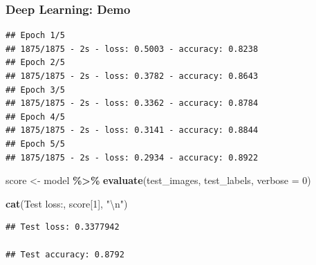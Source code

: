 \documentclass[
  shownotes,
  xcolor={svgnames},
  hyperref={colorlinks,citecolor=DarkBlue,linkcolor=DarkRed,urlcolor=DarkBlue}
  , aspectratio=169]{beamer}
\newenvironment{Shaded}{\begin{snugshade}}{\end{snugshade}}
\newcommand{\CharTok}[1]{\textcolor[rgb]{0.31,0.60,0.02}{#1}}
\newcommand{\DataTypeTok}[1]{\textcolor[rgb]{0.13,0.29,0.53}{#1}}
\newcommand{\DecValTok}[1]{\textcolor[rgb]{0.00,0.00,0.81}{#1}}
\newcommand{\KeywordTok}[1]{\textcolor[rgb]{0.13,0.29,0.53}{\textbf{#1}}}
\newcommand{\NormalTok}[1]{#1}
\newcommand{\OperatorTok}[1]{\textcolor[rgb]{0.81,0.36,0.00}{\textbf{#1}}}
\newcommand{\StringTok}[1]{\textcolor[rgb]{0.31,0.60,0.02}{#1}}
\begin{document}
\begin{frame}[fragile]
\frametitle{Deep Learning: Demo}
\begin{scriptsize}
\begin{verbatim}
## Epoch 1/5
## 1875/1875 - 2s - loss: 0.5003 - accuracy: 0.8238
## Epoch 2/5
## 1875/1875 - 2s - loss: 0.3782 - accuracy: 0.8643
## Epoch 3/5
## 1875/1875 - 2s - loss: 0.3362 - accuracy: 0.8784
## Epoch 4/5
## 1875/1875 - 2s - loss: 0.3141 - accuracy: 0.8844
## Epoch 5/5
## 1875/1875 - 2s - loss: 0.2934 - accuracy: 0.8922
\end{verbatim}
\end{scriptsize}

\begin{Shaded}
\begin{Highlighting}[]
\NormalTok{score \textless{}{-}}\StringTok{ }\NormalTok{model }\OperatorTok{\%\textgreater{}\%}\StringTok{ }\KeywordTok{evaluate}\NormalTok{(test\_images, test\_labels, }\DataTypeTok{verbose =} \DecValTok{0}\NormalTok{)}

\KeywordTok{cat}\NormalTok{(}\StringTok{\textquotesingle{}Test loss:\textquotesingle{}}\NormalTok{, score[}\DecValTok{1}\NormalTok{], }\StringTok{"}\CharTok{\textbackslash{}n}\StringTok{"}\NormalTok{)}
\end{Highlighting}
\end{Shaded}
\begin{scriptsize}

\begin{verbatim}
## Test loss: 0.3377942

## Test accuracy: 0.8792
\end{verbatim}
\end{scriptsize}
\end{frame}

\end{document}
